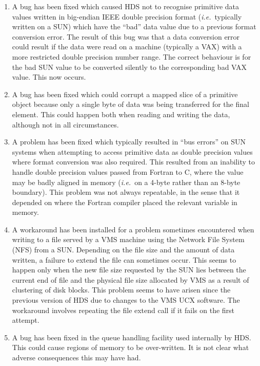 \documentclass[twoside,11pt]{starlink}
\providecommand{\qt}[1]{``#1''}
\providecommand{\st}[1]{{\emph{#1}}}
\begin{document}
\begin{enumerate}
\item
A bug has been fixed which caused HDS not to recognise primitive data
values written in big-endian IEEE double precision format
(\st{i.e.}\ typically written on a SUN) which have the \qt{bad} data value
due to
a previous format conversion error. The result of this bug was that a
data conversion error could result if the data were read on a machine
(typically a VAX) with a more restricted double precision number
range. The correct behaviour is for the bad SUN value to be converted
silently to the corresponding bad VAX value. This now occurs.

\item
A bug has been fixed which could corrupt a mapped slice of a primitive
object because only a single byte of data was being transferred for
the final element.  This could happen both when reading and writing
the data, although not in all circumstances.

\item
A problem has been fixed which typically resulted in \qt{bus errors}
on SUN systems when attempting to access primitive data as double
precision values where format conversion was also required. This
resulted from an inability to handle double precision values passed
from Fortran to C, where the value may be badly aligned in memory
(\st{i.e.}\ on a 4-byte rather than an 8-byte boundary).  This problem
was not always repeatable, in the sense that it depended on where the
Fortran compiler placed the relevant variable in memory.

\item
A workaround has been installed for a problem sometimes encountered
when writing to a file served by a VMS machine using the Network File
System (NFS) from a SUN. Depending on the file size and the amount of
data written, a failure to extend the file can sometimes occur. This
seems to happen only when the new file size requested by the SUN lies
between the current end of file and the physical file size allocated
by VMS as a result of clustering of disk blocks. This problem seems to
have arisen since the previous version of HDS due to changes to the
VMS UCX software. The workaround involves repeating the file extend
call if it fails on the first attempt.

\item
A bug has been fixed in the queue handling facility used internally by
HDS. This could cause regions of memory to be over-written. It is not
clear what adverse consequences this may have had.


\end{enumerate}
\end{document}
